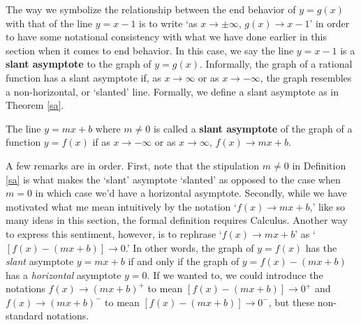 \begin{mfigure}
   

\caption{}
\label{fig:yeqgxeqxsquaredetc}
\end{mfigure}
 
The way we symbolize the relationship between the end behavior of $y=g(x)$ with that of the line $y=x-1$ is to write `as $x \rightarrow \pm \infty$, $g(x) \rightarrow x-1$' in order to have some notational consistency with what we have done earlier in this section when it comes to end behavior.  In this case, we say the line $y=x-1$ is a    \textbf{slant asymptote}  to the graph of $y=g(x)$.  Informally, the graph of a rational function has a slant asymptote if, as $x \rightarrow \infty$ or as $x \rightarrow -\infty$, the graph resembles a non-horizontal, or `slanted' line.  Formally, we define a slant asymptote as in Theorem \ref{sa}.

\begin{mdefn}

\label{sa} The line $y = mx+b$ where $m \neq 0$  is called a \textbf{slant asymptote} of the graph of a function $y=f(x)$ if as $x \rightarrow -\infty$ or as $x \rightarrow \infty$, $f(x)  \rightarrow mx+b$.

\end{mdefn}

A few remarks are in order.  First, note that the stipulation $m \neq 0$ in Definition \ref{sa} is what makes the `slant' asymptote `slanted' as opposed to the case when $m=0$ in which case we'd have a horizontal asymptote.  Secondly, while we have motivated what me mean intuitively by the notation `$f(x)  \rightarrow mx+b$,' like so many ideas in this section, the formal definition requires Calculus.  Another way to express this sentiment, however, is to rephrase `$f(x)  \rightarrow mx+b$' as `$[f(x) - (mx+b)] \rightarrow 0$.'  In other words, the graph of $y=f(x)$ has the \textit{slant} asymptote $y = mx+b$ if and only if the graph of $y = f(x) - (mx+b)$ has a \textit{horizontal} asymptote $y=0$.  If we wanted to, we could introduce the notations $f(x) \rightarrow (mx+b)^{+}$ to mean $[f(x)-(mx+b)] \rightarrow 0^{+}$ and $f(x) \rightarrow (mx+b)^{-}$ to mean $[f(x)-(mx+b)] \rightarrow 0^{-}$, but these non-standard notations.

